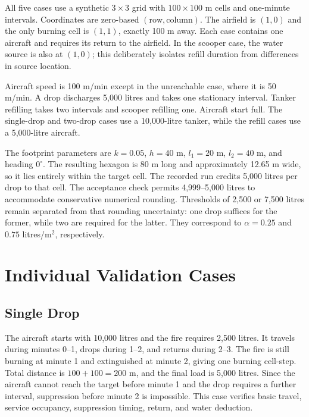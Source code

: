 All five cases use a synthetic $3\times3$ grid with $100\times100$ m cells and one-minute intervals. Coordinates are zero-based $(\mathrm{row},\mathrm{column})$. The airfield is $(1,0)$ and the only burning cell is $(1,1)$, exactly 100 m away. Each case contains one aircraft and requires its return to the airfield. In the scooper case, the water source is also at $(1,0)$; this deliberately isolates refill duration from differences in source location.

Aircraft speed is 100 m/min except in the unreachable case, where it is 50 m/min. A drop discharges 5,000 litres and takes one stationary interval. Tanker refilling takes two intervals and scooper refilling one. Aircraft start full. The single-drop and two-drop cases use a 10,000-litre tanker, while the refill cases use a 5,000-litre aircraft.

The footprint parameters are $k=0.05$, $h=40$ m, $l_1=20$ m, $l_2=40$ m, and heading $0^\circ$. The resulting hexagon is 80 m long and approximately 12.65 m wide, so it lies entirely within the target cell. The recorded run credits 5,000 litres per drop to that cell. The acceptance check permits 4,999--5,000 litres to accommodate conservative numerical rounding. Thresholds of 2,500 or 7,500 litres remain separated from that rounding uncertainty: one drop suffices for the former, while two are required for the latter. They correspond to $\alpha=0.25$ and $0.75$ litres/m$^2$, respectively.

\section{Individual Validation Cases}
\label{sec:validation-cases}

\subsection{Single Drop}

The aircraft starts with 10,000 litres and the fire requires 2,500 litres. It travels during minutes 0--1, drops during 1--2, and returns during 2--3. The fire is still burning at minute 1 and extinguished at minute 2, giving one burning cell-step. Total distance is $100+100=200$ m, and the final load is 5,000 litres. Since the aircraft cannot reach the target before minute 1 and the drop requires a further interval, suppression before minute 2 is impossible. This case verifies basic travel, service occupancy, suppression timing, return, and water deduction.

